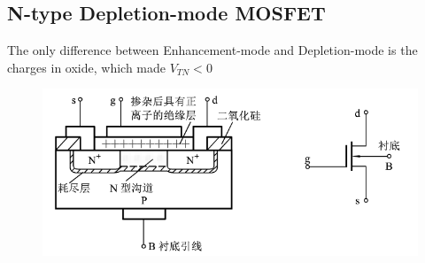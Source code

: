 \subsection{N-type Depletion-mode MOSFET}

The only difference between Enhancement-mode and Depletion-mode is the charges in oxide, which made $V_{TN} < 0$

\begin{figure}[H]
  \centering
  \includegraphics[width=0.7\linewidth]{figures/DNMOS}
  \label{fig:}
\end{figure}

